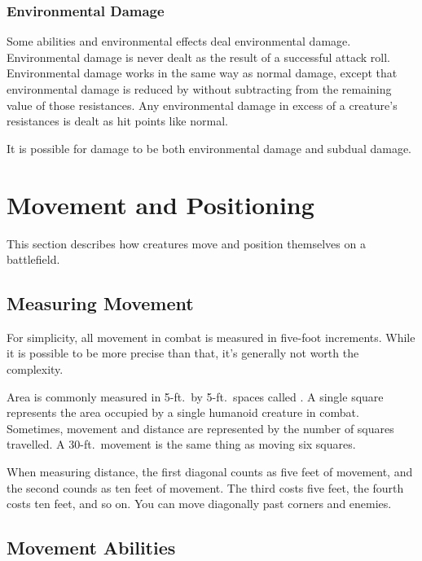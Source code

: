         \subsubsection{Environmental Damage}\label{Environmental Damage}
            Some abilities and environmental effects deal environmental damage.
            Environmental damage is never dealt as the result of a successful attack roll.
            Environmental damage works in the same way as normal damage, except that environmental damage is reduced by  without subtracting from the remaining value of those resistances.
            Any environmental damage in excess of a creature's resistances is dealt as hit points like normal.

            It is possible for damage to be both environmental damage and subdual damage.

\section{Movement and Positioning}\label{Movement and Positioning}

    This section describes how creatures move and position themselves on a battlefield.

    \subsection{Measuring Movement}

        For simplicity, all movement in combat is measured in five-foot increments.
        While it is possible to be more precise than that, it's generally not worth the complexity.

        \label{Squares} Area is commonly measured in 5-ft.\ by 5-ft.\ spaces called .
        A single square represents the area occupied by a single humanoid creature in combat.
        Sometimes, movement and distance are represented by the number of squares travelled.
        A 30-ft.\ movement is the same thing as moving six squares.

        \label{Diagonals} When measuring distance, the first diagonal counts as five feet of movement, and the second counds as ten feet of movement.
        The third costs five feet, the fourth costs ten feet, and so on.
        You can move diagonally past corners and enemies.

    \subsection{Movement Abilities}\label{Movement Abilities}

